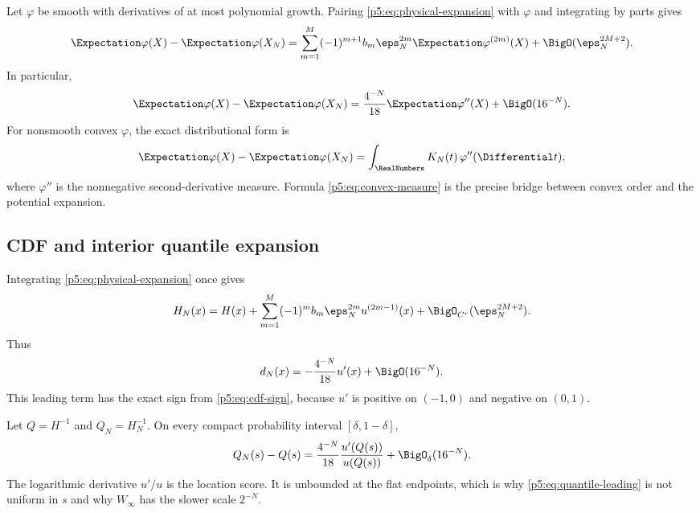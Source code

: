 \documentclass[11pt,oneside]{article}
\numberwithin{equation}{section}
\theoremstyle{definition}
\theoremstyle{remark}
\begin{document}
Let $\varphi$ be smooth with derivatives of at most polynomial growth.  Pairing \eqref{p5:eq:physical-expansion} with $\varphi$ and integrating by parts gives
\begin{equation}
 \Expectation\varphi(X)-\Expectation\varphi(X_N)
 =\sum_{m=1}^{M}(-1)^{m+1}b_m\eps_N^{2m}
 \Expectation\varphi^{(2m)}(X)
 +\BigO(\eps_N^{2M+2}).
 \label{p5:eq:test-expansion}
\end{equation}
In particular,
\begin{equation}
 \Expectation\varphi(X)-\Expectation\varphi(X_N)
 =\frac{4^{-N}}{18}\Expectation\varphi''(X)+\BigO(16^{-N}).
 \label{p5:eq:test-leading}
\end{equation}
For nonsmooth convex $\varphi$, the exact distributional form is
\begin{equation}
 \Expectation\varphi(X)-\Expectation\varphi(X_N)
 =\int_{\RealNumbers}K_N(t)\,\varphi''(\Differential t),
 \label{p5:eq:convex-measure}
\end{equation}
where $\varphi''$ is the nonnegative second-derivative measure.  Formula \eqref{p5:eq:convex-measure} is the precise bridge between convex order and the potential expansion.

\subsection{CDF and interior quantile expansion}

Integrating \eqref{p5:eq:physical-expansion} once gives
\begin{equation}
 H_N(x)=H(x)+\sum_{m=1}^{M}(-1)^mb_m\eps_N^{2m}u^{(2m-1)}(x)
 +\BigO_{C^r}(\eps_N^{2M+2}).
 \label{p5:eq:cdf-expansion}
\end{equation}
Thus
\begin{equation}
 d_N(x)=-\frac{4^{-N}}{18}u'(x)+\BigO(16^{-N}).
 \label{p5:eq:cdf-leading}
\end{equation}
This leading term has the exact sign from \eqref{p5:eq:cdf-sign}, because $u'$ is positive on $(-1,0)$ and negative on $(0,1)$.

Let $Q=H^{-1}$ and $Q_N=H_N^{-1}$.  On every compact probability interval $[\delta,1-\delta]$,
\begin{equation}
 Q_N(s)-Q(s)
 =\frac{4^{-N}}{18}
 \frac{u'(Q(s))}{u(Q(s))}
 +\BigO_{\delta}(16^{-N}).
 \label{p5:eq:quantile-leading}
\end{equation}
The logarithmic derivative $u'/u$ is the location score.  It is unbounded at the flat endpoints, which is why \eqref{p5:eq:quantile-leading} is not uniform in $s$ and why $W_\infty$ has the slower scale $2^{-N}$.
\end{document}
